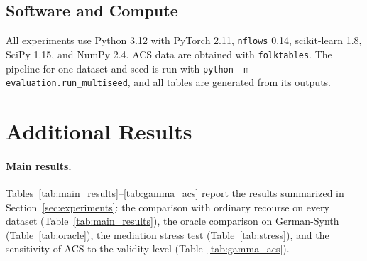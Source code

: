 \subsection{Software and Compute}
\label{app:exp_software}

All experiments use Python 3.12 with PyTorch 2.11, \texttt{nflows} 0.14,
scikit-learn 1.8, SciPy 1.15, and NumPy 2.4. ACS data are obtained with
\texttt{folktables}. The pipeline for one dataset and seed is run with
\texttt{python -m evaluation.run\_multiseed}, and all tables are generated
from its outputs.

\section{Additional Results}
\label{app:results}

\paragraph{Main results.}
Tables~\ref{tab:main_results}--\ref{tab:gamma_acs} report the results
summarized in Section~\ref{sec:experiments}:
the comparison with ordinary recourse on every dataset
(Table~\ref{tab:main_results}), the oracle comparison on German-Synth
(Table~\ref{tab:oracle}), the mediation stress test
(Table~\ref{tab:stress}), and the sensitivity of ACS to the validity level
(Table~\ref{tab:gamma_acs}).

